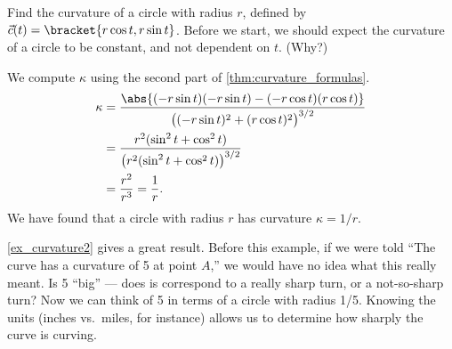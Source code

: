 \begin{example}\label{ex_curvature2}
Find the curvature of a circle with radius $r$, defined by $\vec c(t) =\bracket{r\cos t,r\sin t}$.
\solution
Before we start, we should expect the curvature of a circle to be constant, and not dependent on $t$. (Why?)

We compute $\kappa$ using the second part of \autoref{thm:curvature_formulas}.
\begin{align*}
	\kappa
	&= \frac{\abs{(-r\sin t)(-r\sin t) - (-r\cos t)(r\cos t)}}{\bigl( (-r\sin t)^2+(r\cos t)^2\bigr)^{3/2}} \smallskip\\
	&= \frac{r^2(\sin^2t+\cos^2t)}{\bigl(r^2(\sin^2t+\cos^2t)\bigr)^{3/2}}\smallskip\\
	&= \frac{r^2}{r^3} = \frac1r.
\end{align*}
We have found that a circle with radius $r$ has curvature $\kappa = 1/r$.
\end{example}

\autoref{ex_curvature2} gives a great result. Before this example, if we were told ``The curve has a curvature of 5 at point $A$,'' we would have no idea what this really meant. Is 5 ``big'' --- does is correspond to a really sharp turn, or a not-so-sharp turn? Now we can think of 5 in terms of a circle with radius 1/5. Knowing the units (inches vs.\ miles, for instance) allows us to determine how sharply the curve is curving.\bigskip

